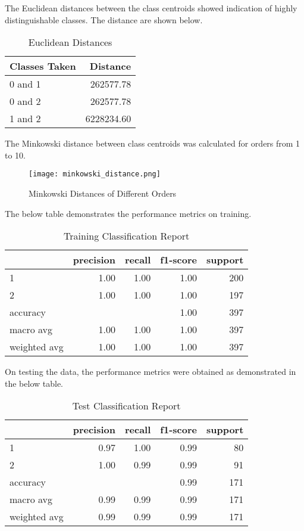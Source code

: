 \documentclass[conference]{IEEEtran}
\begin{document}
The Euclidean distances between the class centroids showed indication of highly
distinguishable classes. The distance are shown below.

\begin{table}[htbp]
\caption{Euclidean Distances}
\centering
\begin{tabular}{lr}
Classes Taken & Distance\\
\hline
0 and 1 & 262577.78\\
0 and 2 & 262577.78\\
1 and 2 & 6228234.60\\
\end{tabular}
\end{table}


The Minkowski distance between class centroids was calculated for orders from 1
to 10.

\begin{figure}[htbp]
    \centering
    \texttt{[image: minkowski\_distance.png]}
    \caption{Minkowski Distances of Different Orders}
    \label{fig:example}
\end{figure}

The below table demonstrates the performance metrics on training.

\begin{table}[htbp]
\caption{Training Classification Report}
\centering
\begin{tabular}{lrrrr}
 & precision & recall & f1-score & support\\
\hline
1 & 1.00 & 1.00 & 1.00 & 200\\
2 & 1.00 & 1.00 & 1.00 & 197\\
accuracy &  &  & 1.00 & 397\\
macro avg & 1.00 & 1.00 & 1.00 & 397\\
weighted avg & 1.00 & 1.00 & 1.00 & 397\\
\end{tabular}
\end{table}

On testing the data, the performance metrics were obtained as demonstrated in the below table.

\begin{table}[htbp]
\caption{Test Classification Report}
\centering
\begin{tabular}{lrrrr}
 & precision & recall & f1-score & support\\
\hline
1 & 0.97 & 1.00 & 0.99 & 80\\
2 & 1.00 & 0.99 & 0.99 & 91\\
accuracy &  &  & 0.99 & 171\\
macro avg & 0.99 & 0.99 & 0.99 & 171\\
weighted avg & 0.99 & 0.99 & 0.99 & 171\\
\end{tabular}
\end{table}
\end{document}
